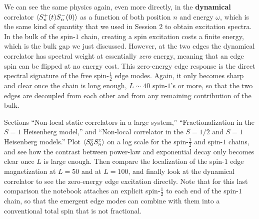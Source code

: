 \documentclass[lecture_notes.tex]{subfiles}
\begin{document}
We can see the same physics again, even more directly, in the \textbf{dynamical} correlator
$\expval{S_n^+(t)S_n^-(0)}$ as a function of both position $n$ and energy $\omega$, which is the
same kind of quantity that we used in Session 2 to obtain excitation spectra. In the bulk of the
spin-$1$ chain, creating a spin excitation costs a finite energy, which is the bulk gap we just
discussed. However, at the two edges the dynamical correlator has spectral weight at essentially
\emph{zero} energy, meaning that an edge spin can be flipped at no energy cost. This zero-energy
edge response is the direct spectral signature of the free spin-$\tfrac12$ edge modes. Again, it
only becomes sharp and clear once the chain is long enough, $L\sim 40$ spin-$1$'s or more, so that
the two edges are decoupled from each other and from any remaining contribution of the bulk.

\begin{notebook}
Sections ``Non-local static correlators in a large system,'' ``Fractionalization in the $S=1$
Heisenberg model,'' and ``Non-local correlator in the $S=1/2$ and $S=1$ Heisenberg models.'' Plot
$\expval{S_0^zS_n^z}$ on a log scale for the spin-$\tfrac12$ and spin-$1$ chains, and see how the
contrast between power-law and exponential decay only becomes clear once $L$ is large enough. Then
compare the localization of the spin-$1$ edge magnetization at $L=50$ and at $L=100$, and finally
look at the dynamical correlator to see the zero-energy edge excitation directly. Note that for
this last comparison the notebook attaches an explicit spin-$\tfrac12$ to each end of the
spin-$1$ chain, so that the emergent edge modes can combine with them into a conventional total
spin that is not fractional.
\end{notebook}
\end{document}
